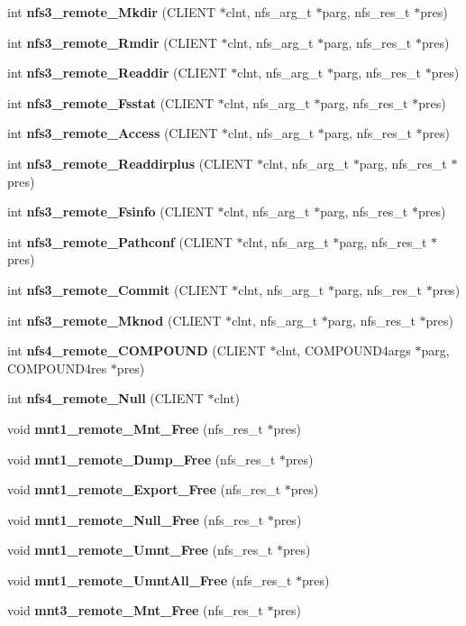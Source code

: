 \begin{DoxyCompactItemize}
\item 
int {\bf nfs3\_\-remote\_\-Mkdir} (CLIENT $\ast$clnt, nfs\_\-arg\_\-t $\ast$parg, nfs\_\-res\_\-t $\ast$pres)
\item 
int {\bf nfs3\_\-remote\_\-Rmdir} (CLIENT $\ast$clnt, nfs\_\-arg\_\-t $\ast$parg, nfs\_\-res\_\-t $\ast$pres)
\item 
int {\bf nfs3\_\-remote\_\-Readdir} (CLIENT $\ast$clnt, nfs\_\-arg\_\-t $\ast$parg, nfs\_\-res\_\-t $\ast$pres)
\item 
int {\bf nfs3\_\-remote\_\-Fsstat} (CLIENT $\ast$clnt, nfs\_\-arg\_\-t $\ast$parg, nfs\_\-res\_\-t $\ast$pres)
\item 
int {\bf nfs3\_\-remote\_\-Access} (CLIENT $\ast$clnt, nfs\_\-arg\_\-t $\ast$parg, nfs\_\-res\_\-t $\ast$pres)
\item 
int {\bf nfs3\_\-remote\_\-Readdirplus} (CLIENT $\ast$clnt, nfs\_\-arg\_\-t $\ast$parg, nfs\_\-res\_\-t $\ast$pres)
\item 
int {\bf nfs3\_\-remote\_\-Fsinfo} (CLIENT $\ast$clnt, nfs\_\-arg\_\-t $\ast$parg, nfs\_\-res\_\-t $\ast$pres)
\item 
int {\bf nfs3\_\-remote\_\-Pathconf} (CLIENT $\ast$clnt, nfs\_\-arg\_\-t $\ast$parg, nfs\_\-res\_\-t $\ast$pres)
\item 
int {\bf nfs3\_\-remote\_\-Commit} (CLIENT $\ast$clnt, nfs\_\-arg\_\-t $\ast$parg, nfs\_\-res\_\-t $\ast$pres)
\item 
int {\bf nfs3\_\-remote\_\-Mknod} (CLIENT $\ast$clnt, nfs\_\-arg\_\-t $\ast$parg, nfs\_\-res\_\-t $\ast$pres)
\item 
int {\bf nfs4\_\-remote\_\-COMPOUND} (CLIENT $\ast$clnt, COMPOUND4args $\ast$parg, COMPOUND4res $\ast$pres)
\item 
int {\bf nfs4\_\-remote\_\-Null} (CLIENT $\ast$clnt)
\item 
void {\bf mnt1\_\-remote\_\-Mnt\_\-Free} (nfs\_\-res\_\-t $\ast$pres)
\item 
void {\bf mnt1\_\-remote\_\-Dump\_\-Free} (nfs\_\-res\_\-t $\ast$pres)
\item 
void {\bf mnt1\_\-remote\_\-Export\_\-Free} (nfs\_\-res\_\-t $\ast$pres)
\item 
void {\bf mnt1\_\-remote\_\-Null\_\-Free} (nfs\_\-res\_\-t $\ast$pres)
\item 
void {\bf mnt1\_\-remote\_\-Umnt\_\-Free} (nfs\_\-res\_\-t $\ast$pres)
\item 
void {\bf mnt1\_\-remote\_\-UmntAll\_\-Free} (nfs\_\-res\_\-t $\ast$pres)
\item 
void {\bf mnt3\_\-remote\_\-Mnt\_\-Free} (nfs\_\-res\_\-t $\ast$pres)

\end{DoxyCompactItemize}
